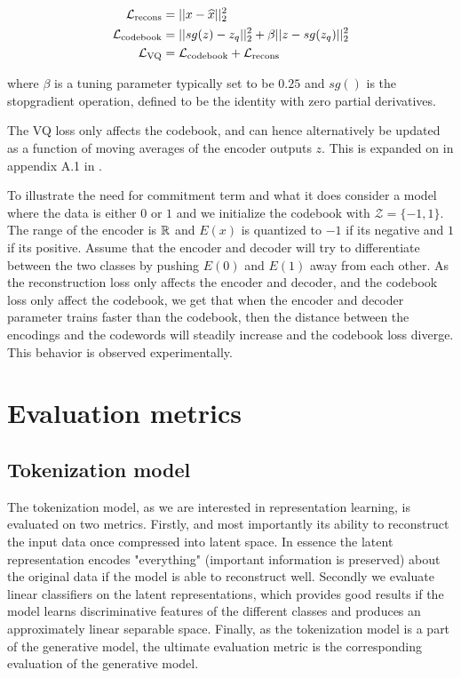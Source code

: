 \documentclass[../../thesis.tex]{subfiles}
\begin{document}
    \begin{equation}     
        \label{eq:VQVAELoss}
        \begin{aligned}
            \mathcal{L}_{\text{recons}} &= ||x - \widehat{x}||_2^2\\
            \mathcal{L}_{\text{codebook}} &= ||sg(z) - z_q||_2^2 +\beta||z - sg(z_q)||_2^2\\
            \mathcal{L}_{\text{VQ}} &= \mathcal{L}_{\text{codebook}} + \mathcal{L}_{\text{recons}}
        \end{aligned}
    \end{equation}

where $\beta$ is a tuning parameter typically set to be $0.25$ and $sg()$ is the stopgradient operation, defined to be the identity with zero partial derivatives. \newline

The VQ loss only affects the codebook, and can hence alternatively be updated as a function of moving averages of the encoder outputs $z$. This is expanded on in appendix A.1 in \cite{VQVAE}.\newline 

To illustrate the need for commitment term and what it does consider a model where the data is either $0$ or $1$ and we initialize the codebook with $\mathcal{Z} = \{-1,1\}$.  The range of the encoder is $\mathbb{R}$ and $E(x)$ is quantized to $-1$ if its negative and $1$ if its positive. Assume that the encoder and decoder will try to differentiate between the two classes by pushing $E(0)$ and $E(1)$ away from each other. As the reconstruction loss only affects the encoder and decoder, and the codebook loss only affect the codebook, we get that when the encoder and decoder parameter trains faster than the codebook, then the distance between the encodings and the codewords will steadily increase and the codebook loss diverge. This behavior is observed experimentally. \newline 


\section{Evaluation metrics}

\subsection{Tokenization model}

The tokenization model, as we are interested in representation learning, is evaluated on two metrics. Firstly, and most importantly its ability to reconstruct the input data once compressed into latent space. In essence the latent representation encodes "everything" (important information is preserved) about the original data if the model is able to reconstruct well. Secondly we evaluate linear classifiers on the latent representations, which provides good results if the model learns discriminative features of the different classes and produces an approximately linear separable space. Finally, as the tokenization model is a part of the generative model, the ultimate evaluation metric is the corresponding evaluation of the generative model. 
\end{document}
